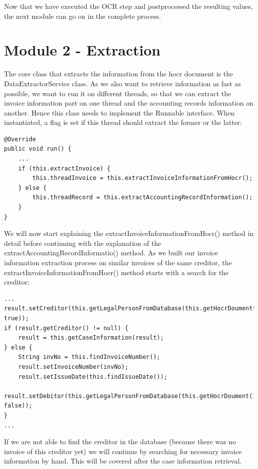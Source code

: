 Now that we have executed the OCR step and postprocessed the resulting values, the next module can go on in the complete process.

\section{Module 2 - Extraction}

The core class that extracts the information from the hocr document is the DataExtractorService class. As we also want to retrieve information as fast as possible, we want to run it on different threads, so that we can extract the invoice information part on one thread and the accounting records information on another. Hence this class needs to implement the Runnable interface. When instantiated, a flag is set if this thread should extract the former or the latter:

\begin{lstlisting}[caption={Beginning of the information extraction}]
@Override
public void run() {
    ...
    if (this.extractInvoice) {
        this.threadInvoice = this.extractInvoiceInformationFromHocr();
    } else {
        this.threadRecord = this.extractAccountingRecordInformation();
    }
}
\end{lstlisting}

We will now start explaining the extractInvoiceInformationFromHocr() method in detail before continuing with the explanation of the extractAccountingRecordInformatio() method.
As we built our invoice information extraction process on similar invoices of the same creditor, the extractInvoiceInformationFromHocr() method starts with a search for the creditor:

\begin{lstlisting}[caption={Call for creditor in the database}]
...
result.setCreditor(this.getLegalPersonFromDatabase(this.getHocrDoument(), true));
if (result.getCreditor() != null) {
    result = this.getCaseInformation(result);
} else {
    String invNo = this.findInvoiceNumber();
    result.setInvoiceNumber(invNo);
    result.setIssueDate(this.findIssueDate());
    result.setDebitor(this.getLegalPersonFromDatabase(this.getHocrDoument(), false));
}
...
\end{lstlisting}

If we are not able to find the creditor in the database (because there was no invoice of this creditor yet) we will continue by searching for necessary invoice information by hand. This will be covered after the case information retrieval.


